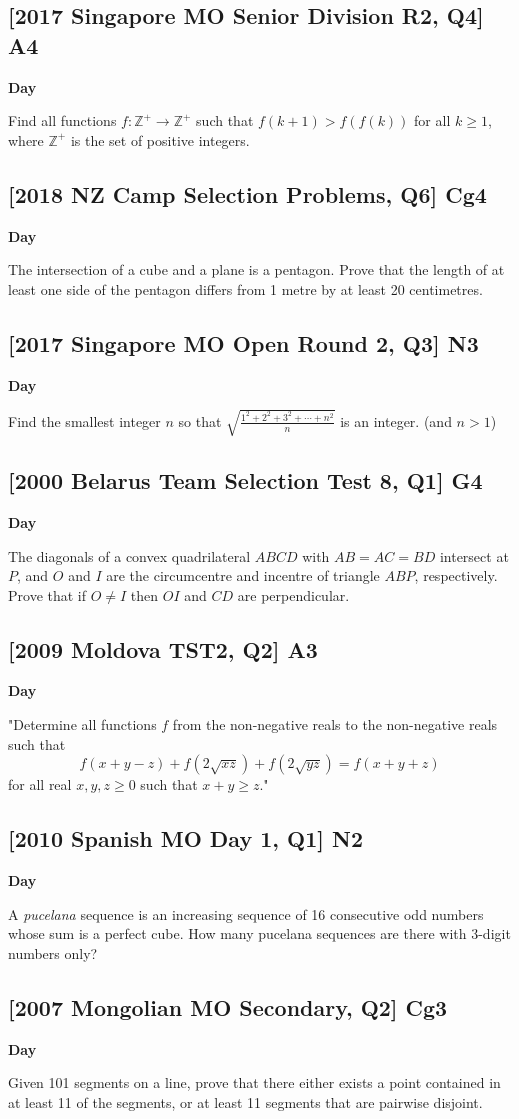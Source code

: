 \documentclass[10pt]{article}
\newcommand{\themonth}{March}
\newcommand{\theyear}{2019}
\newcounter{day}
\newcounter{solution}
\newcounter{datenumber}
\newcommand{\problem}[4][0]{
	\newpage
	\subsection{[#3] \space #2} \hfill 
	{\large\textbf{Day \arabic{day}}} %
	\begin{flushleft} #4 \end{flushleft}
	\vspace{1em}
	\addtocounter{day}{1}
	\addtocounter{datenumber}{1}
	\setcounter{solution}{1}
}
\begin{document}
\problem[88]{A4}{2017 Singapore MO Senior Division R2, Q4}{Find all functions $f : \mathbb{Z}^{+} \to \mathbb{Z}^{+}$ such that $f(k+1) > f(f(k))$ for all $k \geq 1$, where $\mathbb{Z}^{+}$ is the set of positive integers. }

\problem[89]{Cg4}{2018 NZ Camp Selection Problems, Q6}{The intersection of a cube and a plane is a pentagon. Prove that the length of at least one side of the pentagon differs from 1 metre by at least 20 centimetres. }

\problem[90]{N3}{2017 Singapore MO Open Round 2, Q3}{Find the smallest integer $n$ so that $\sqrt{\frac{1^2+2^2+3^2+ \cdots + n^2}{n}}$ is an integer. (and $n > 1$)}

\problem[91]{G4}{2000 Belarus Team Selection Test 8, Q1}{The diagonals of a convex quadrilateral \(ABCD\) with \(AB = AC = BD\) intersect at \(P\), and \(O\) and \(I\) are the circumcentre and incentre of triangle \(ABP\), respectively. Prove that if \(O \neq I\) then \(OI\) and \(CD\) are perpendicular.}

\problem[92]{A3}{2009 Moldova TST2, Q2}{"Determine all functions \(f\) from the non-negative reals to the non-negative reals such that
	\[f\left(x+y-z\right) + f\left(2\sqrt{xz}\right) + f\left(2\sqrt{yz}\right) = f\left(x+y+z\right)\]
	for all real \(x,y,z \geq 0\) such that \(x + y \geq z\)."}

\problem[93]{N2}{2010 Spanish MO Day 1, Q1}{A \textit{pucelana} sequence is an increasing sequence of 16 consecutive odd numbers whose sum is a perfect cube. How many pucelana sequences are there with 3-digit numbers only?}

\problem[94]{Cg3}{2007 Mongolian MO Secondary, Q2}{Given 101 segments on a line, prove that there either exists a point contained in at least 11 of the segments, or at least 11 segments that are pairwise disjoint.}
\end{document}
